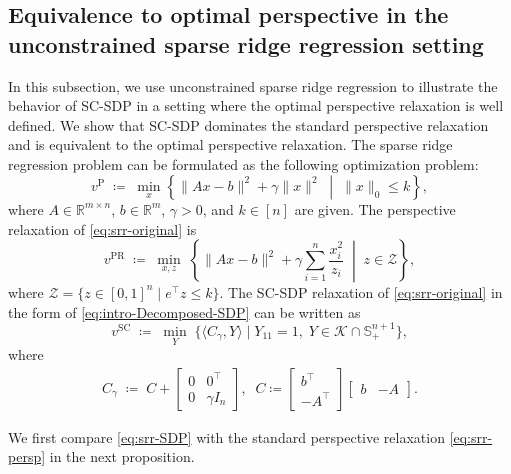 \documentclass[11pt]{article}
\def\K{\mathcal{K}}
\def\R{\mathbb{R}}
\def\S{\mathbb{S}}
\theoremstyle{plain}
\begin{document}
\subsection{Equivalence to optimal perspective 
in the unconstrained sparse ridge regression setting}\label{subsec:applications}

In this subsection, we use unconstrained sparse ridge regression to illustrate the behavior of SC-SDP in a setting where the optimal perspective relaxation is well defined. We show that SC-SDP dominates the standard perspective relaxation and is equivalent to the optimal perspective relaxation.
The sparse ridge regression problem can be formulated as the following optimization problem:
\begin{equation}\label{eq:srr-original}
v^{\mathrm{P}}
\;\coloneqq\;
\min_{x}
\left\{
\|Ax-b\|^2+\gamma \|x\|^2
\;\middle|\;
\|x\|_0\le k
\right\},
\end{equation}
where $A\in\R^{m\times n}$, $b\in\R^m$, $\gamma>0$, and $k\in[n]$ are given.
The perspective relaxation of \eqref{eq:srr-original} is
\begin{equation}\label{eq:srr-persp}
    v^{\mathrm{PR}}
\;\coloneqq\;
\min_{x,z}\;
 \left\{
    \|Ax-b\|^2+\gamma \sum_{i=1}^n \frac{x_i^2}{z_i}
    \;\middle|\;  
    z\in \mathcal{Z}
\right\},
\end{equation}
where $\mathcal{Z}=\{z\in [0,1]^n \mid  e^\top z \le k\}$.
The SC-SDP relaxation of \eqref{eq:srr-original} in the form of \eqref{eq:intro-Decomposed-SDP} can be written as
\begin{equation}\label{eq:srr-SDP}
v^{\mathrm{SC}}\;\coloneqq\;\min_{Y}\;
\Big\{
\langle C_\gamma,Y\rangle 
\;\Big|\;
Y_{11}=1,\;
Y\in \K\cap \S_+^{n+1}
\Big\},
\end{equation}
where 
\[
\begin{aligned}
C_\gamma \;\coloneqq\; C+\begin{bmatrix}
0 & 0^\top\\
0 & \gamma I_n
\end{bmatrix},\;\;
C\coloneqq \begin{bmatrix}
    b^\top\\-A^\top
\end{bmatrix}\begin{bmatrix}
b & -A
\end{bmatrix}.
\end{aligned}
\]

We first compare \eqref{eq:srr-SDP} with the standard perspective relaxation \eqref{eq:srr-persp} in the next proposition. 
\end{document}
